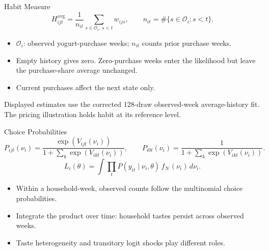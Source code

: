\gdef\shortbuttons{\hyperlink{short-27}{\beamergotobutton{Back}}}
\begin{frame}[label=short-average-history,noframenumbering]{Habit Measure}
  \[
    H^{\mathrm{avg}}_{ijt}=\frac{1}{n_{it}}
      \sum_{s\in\mathcal{O}_i,\,s<t}w_{ijs},
    \qquad n_{it}=\#\{s\in\mathcal{O}_i:s<t\}.
  \]
  \begin{itemize}
    \item $\mathcal{O}_i$: observed yogurt-purchase weeks; $n_{it}$ counts prior purchase weeks.
    \item Empty history gives zero. Zero-purchase weeks enter the likelihood but leave the purchase-share average unchanged.
    \item Current purchases affect the next state only.
  \end{itemize}
  \begin{tcolorbox}
    Displayed estimates use the corrected 128-draw observed-week average-history fit.
    The pricing illustration holds habit at its reference level.
  \end{tcolorbox}
\end{frame}



\gdef\shortbuttons{\hyperlink{short-29}{\beamergotobutton{Back}}}
\begin{frame}[label=short-28,noframenumbering]{Choice Probabilities}
  \[
    P_{ijt}(\nu_i)=\frac{\exp(V_{ijt}(\nu_i))}{1+\sum_k\exp(V_{ikt}(\nu_i))},\qquad
    P_{i0t}(\nu_i)=\frac{1}{1+\sum_k\exp(V_{ikt}(\nu_i))}.
  \]
  \[
    L_i(\theta)=\int\prod_t P(y_{it}\mid\nu_i,\theta)\,f_{\mathcal N}(\nu_i)\,d\nu_i.
  \]
  \begin{itemize}
    \item Within a household-week, observed counts follow the multinomial choice probabilities.
    \item Integrate the product over time: household tastes persist across observed weeks.
    \item Taste heterogeneity and transitory logit shocks play different roles.
  \end{itemize}
\end{frame}



